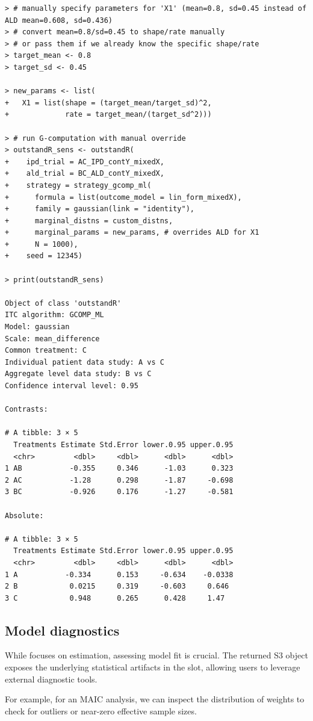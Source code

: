 \documentclass[article]{jss}
\begin{document}
\begin{verbatim}
> # manually specify parameters for 'X1' (mean=0.8, sd=0.45 instead of ALD mean=0.608, sd=0.436)
> # convert mean=0.8/sd=0.45 to shape/rate manually 
> # or pass them if we already know the specific shape/rate
> target_mean <- 0.8
> target_sd <- 0.45

> new_params <- list(
+   X1 = list(shape = (target_mean/target_sd)^2, 
+             rate = target_mean/(target_sd^2)))

> # run G-computation with manual override
> outstandR_sens <- outstandR(
+    ipd_trial = AC_IPD_contY_mixedX,
+    ald_trial = BC_ALD_contY_mixedX,
+    strategy = strategy_gcomp_ml(
+      formula = list(outcome_model = lin_form_mixedX),
+      family = gaussian(link = "identity"),
+      marginal_distns = custom_distns,
+      marginal_params = new_params, # overrides ALD for X1
+      N = 1000),
+    seed = 12345)

> print(outstandR_sens)

Object of class 'outstandR' 
ITC algorithm: GCOMP_ML 
Model: gaussian 
Scale: mean_difference 
Common treatment: C 
Individual patient data study: A vs C 
Aggregate level data study: B vs C 
Confidence interval level: 0.95 

Contrasts:

# A tibble: 3 × 5
  Treatments Estimate Std.Error lower.0.95 upper.0.95
  <chr>         <dbl>     <dbl>      <dbl>      <dbl>
1 AB           -0.355     0.346      -1.03      0.323
2 AC           -1.28      0.298      -1.87     -0.698
3 BC           -0.926     0.176      -1.27     -0.581

Absolute:

# A tibble: 3 × 5
  Treatments Estimate Std.Error lower.0.95 upper.0.95
  <chr>         <dbl>     <dbl>      <dbl>      <dbl>
1 A           -0.334      0.153     -0.634    -0.0338
2 B            0.0215     0.319     -0.603     0.646 
3 C            0.948      0.265      0.428     1.47  
\end{verbatim}


\subsection{Model diagnostics}
While  focuses on estimation, assessing model fit is crucial. The returned S3 object exposes the underlying statistical artifacts in the  slot, allowing users to leverage external diagnostic tools.

For example, for an MAIC analysis, we can inspect the distribution of weights to check for outliers or near-zero effective sample sizes.
\end{document}
